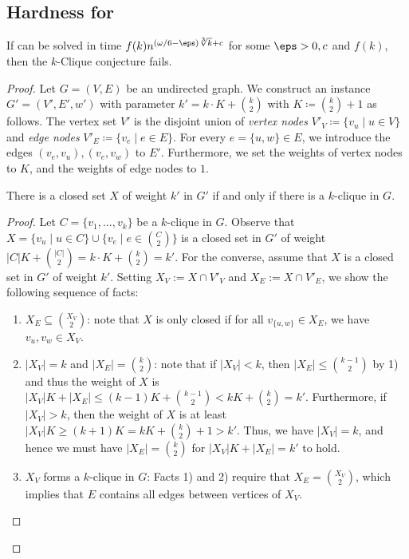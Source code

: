 \subsection{Hardness for \Implication}
%
\begin{thm}\label{thm:implhardness}
If \Implication can be solved in time $f(k) n^{(\omega/6-\eps)\sqrt[3]{k}+c}$ for some $\eps>0, c$ and $f(k)$, then the $k$-Clique conjecture fails.
\end{thm}
\begin{proof}
%
Let $G=(V, E)$ be an undirected graph.
We construct an \wDAGImplication instance $G' = (V', E', w')$ with parameter $k' = k\cdot K + {k \choose 2}$ with $K\coloneqq {k \choose 2}+1$ as follows.
The vertex set $V'$ is the disjoint union of \emph{vertex nodes} $V'_V \coloneqq \{v_u \mid u\in V\}$  and \emph{edge nodes} $V'_E \coloneqq \{v_e \mid e\in E\}$. For every $e=\{u,w\}\in E$, we introduce the edges $(v_e, v_u), (v_e, v_w)$ to $E'$. Furthermore, we set the weights of vertex nodes to $K$, and the weights of edge nodes to $1$. 
%
\begin{claim}
There is a closed set $X$ of weight $k'$ in $G'$ if and only if there is a $k$-clique in $G$.
\end{claim}
\begin{proof}
Let $C=\{v_1, \dots, v_k\}$ be a $k$-clique in $G$. Observe that $X = \{ v_u \mid u\in C\} \cup \{ v_e \mid e\in {C\choose 2}\}$ is a closed set in $G'$ of weight $|C|K + {|C| \choose 2} = k\cdot K + {k \choose 2} = k'$.
%
For the converse, assume that $X$ is a closed set in $G'$ of weight $k'$. Setting $X_V := X\cap V'_V$ and $X_E := X\cap V'_E$, we show the following sequence of facts:
\begin{enumerate}[label=\arabic*)]
\item $X_E \subseteq {X_V \choose 2}$: note that $X$ is only closed if for all $v_{\{u,w\}} \in X_E$, we have $v_u, v_w \in X_V$.
\item $|X_V| = k$ and $|X_E| = {k \choose 2}$: note that if $|X_V|< k$, then $|X_E| \le {k-1 \choose 2}$ by 1) and thus the weight of $X$ is $|X_V|K+|X_E| \le (k-1)K + {k-1 \choose 2} < kK+ {k \choose 2} = k'$. Furthermore, if $|X_V|>k$, then the weight of $X$ is at least $|X_V|K \ge (k+1)K = kK + {k \choose 2} + 1> k'$. Thus, we have $|X_V| = k$, and hence we must have $|X_E| = {k \choose 2}$ for $|X_V|K + |X_E| = k'$ to hold.
%
\item $X_V$ forms a $k$-clique in $G$: Facts 1) and 2) require that $X_E = {X_V \choose 2}$, which implies that $E$ contains all edges between vertices of $X_V$. 

\end{enumerate}
\end{proof}
\end{proof}

